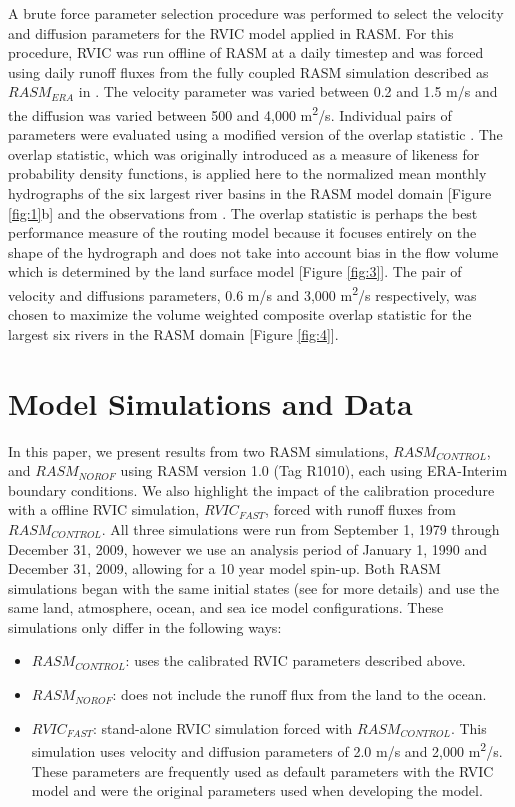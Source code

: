 \documentclass[jgrga, draft]{agutex}
\begin{document}
\begin{article}
A brute force parameter selection procedure was performed to select the velocity and diffusion parameters for the RVIC model applied in RASM.
For this procedure, RVIC was run offline of RASM at a daily timestep and was forced using daily runoff fluxes from the fully coupled RASM simulation described as $RASM_{ERA}$ in \citep{Hamman_2016}.
The velocity parameter was varied between 0.2 and 1.5 m/s and the diffusion was varied between 500 and 4,000 m\textsuperscript{2}/s.
Individual pairs of parameters were evaluated using a modified version of the overlap statistic \citet{Perkins_2012}.
The overlap statistic, which was originally introduced as a measure of likeness for probability density functions, is applied here to the normalized mean monthly hydrographs of the six largest river basins in the RASM model domain [Figure \ref{fig:1}b] and the observations from \citet{Dai_2009}.
The overlap statistic is perhaps the best performance measure of the routing model because it focuses entirely on the shape of the hydrograph and does not take into account bias in the flow volume which is determined by the land surface model [Figure \ref{fig:3}].
The pair of velocity and diffusions parameters, 0.6 m/s and 3,000 m\textsuperscript{2}/s respectively, was chosen to maximize the volume weighted composite overlap statistic for the largest six rivers in the RASM domain [Figure \ref{fig:4}].

\section{Model Simulations and Data}

In this paper, we present results from two RASM simulations, $RASM_{CONTROL}$, and $RASM_{NOROF}$ using RASM version 1.0 (Tag R1010), each using ERA-Interim boundary conditions.
We also highlight the impact of the calibration procedure with a offline RVIC simulation, $RVIC_{FAST}$, forced with runoff fluxes from $RASM_{CONTROL}$.
All three simulations were run from September 1, 1979 through December 31, 2009, however we use an analysis period of January 1, 1990 and December 31, 2009, allowing for a 10 year model spin-up.
Both RASM simulations began with the same initial states (see \citet{Hamman_2016} for more details) and use the same land, atmosphere, ocean, and sea ice model configurations.
These simulations only differ in the following ways:
\begin{itemize}
     \item $RASM_{CONTROL}$: uses the calibrated RVIC parameters described above.
     \item $RASM_{NOROF}$: does not include the runoff flux from the land to the ocean.
     \item $RVIC_{FAST}$: stand-alone RVIC simulation forced with $RASM_{CONTROL}$.
          This simulation uses velocity and diffusion parameters of 2.0 m/s and 2,000 m\textsuperscript{2}/s.
          These parameters are frequently used as default parameters with the RVIC model and were the original parameters used when developing the model.
\end{itemize}


\end{article}
\end{document}
